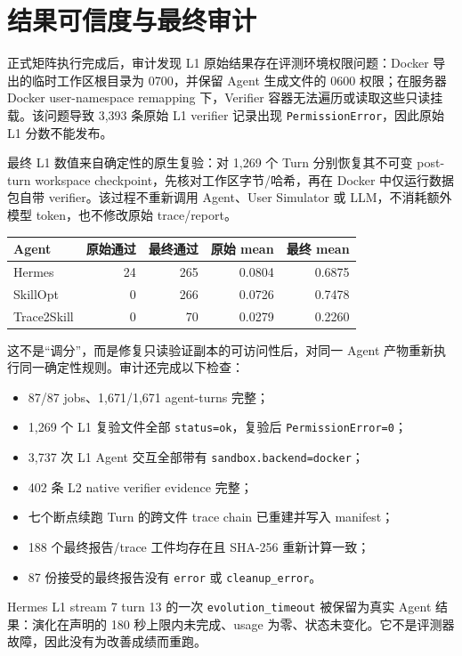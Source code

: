 \documentclass[11pt,a4paper]{article}
\newcommand{\code}[1]{\texttt{#1}}
\begin{document}
\section{结果可信度与最终审计}

正式矩阵执行完成后，审计发现 L1 原始结果存在评测环境权限问题：Docker 导出的临时工作区根目录为 0700，并保留 Agent 生成文件的 0600 权限；在服务器 Docker user-namespace remapping 下，Verifier 容器无法遍历或读取这些只读挂载。该问题导致 3,393 条原始 L1 verifier 记录出现 \code{PermissionError}，因此原始 L1 分数不能发布。

最终 L1 数值来自确定性的原生复验：对 1,269 个 Turn 分别恢复其不可变 post-turn workspace checkpoint，先核对工作区字节/哈希，再在 Docker 中仅运行数据包自带 verifier。该过程不重新调用 Agent、User Simulator 或 LLM，不消耗额外模型 token，也不修改原始 trace/report。

\begin{center}
\renewcommand{\arraystretch}{1.2}
\begin{tabular}{lrrrr}
\toprule
Agent & 原始通过 & 最终通过 & 原始 mean & 最终 mean \\
\midrule
Hermes & 24 & 265 & 0.0804 & 0.6875 \\
SkillOpt & 0 & 266 & 0.0726 & 0.7478 \\
Trace2Skill & 0 & 70 & 0.0279 & 0.2260 \\
\bottomrule
\end{tabular}
\end{center}

这不是“调分”，而是修复只读验证副本的可访问性后，对同一 Agent 产物重新执行同一确定性规则。审计还完成以下检查：

\begin{itemize}
\item 87/87 jobs、1,671/1,671 agent-turns 完整；
\item 1,269 个 L1 复验文件全部 \code{status=ok}，复验后 \code{PermissionError=0}；
\item 3,737 次 L1 Agent 交互全部带有 \code{sandbox.backend=docker}；
\item 402 条 L2 native verifier evidence 完整；
\item 七个断点续跑 Turn 的跨文件 trace chain 已重建并写入 manifest；
\item 188 个最终报告/trace 工件均存在且 SHA-256 重新计算一致；
\item 87 份接受的最终报告没有 \code{error} 或 \code{cleanup\_error}。
\end{itemize}

Hermes L1 stream 7 turn 13 的一次 \code{evolution\_timeout} 被保留为真实 Agent 结果：演化在声明的 180 秒上限内未完成、usage 为零、状态未变化。它不是评测器故障，因此没有为改善成绩而重跑。
\end{document}
